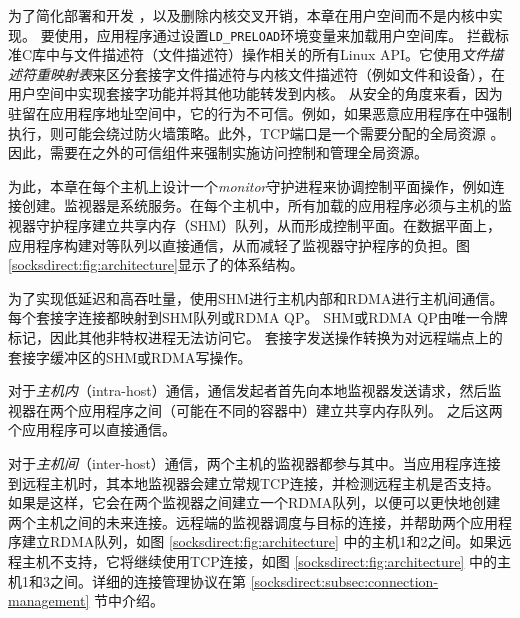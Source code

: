 
为了简化部署和开发 \cite {andromeda}，以及删除内核交叉开销，本章在用户空间而不是内核中实现\sys{}。
要使用\sys{}，应用程序通过设置\texttt {LD\_PRELOAD}环境变量来加载用户空间库\libipc {}。 \libipc {}拦截标准C库中与文件描述符（文件描述符）操作相关的所有Linux API。它使用\emph {文件描述符重映射表}来区分套接字文件描述符与内核文件描述符（例如文件和设备），在用户空间中实现套接字功能并将其他功能转发到内核。
从安全的角度来看，因为\libipc {}驻留在应用程序地址空间中，它的行为不可信。例如，如果恶意应用程序在\libipc {}中强制执行，则可能会绕过防火墙策略。此外，TCP端口是一个需要分配的全局资源 \cite {lin2016scalable,nsdi19freeflow}。因此，需要在\libipc {}之外的可信组件来强制实施访问控制和管理全局资源。

为此，本章在每个主机上设计一个\emph {monitor}守护进程来协调控制平面操作，例如连接创建。监视器是系统服务。在每个主机中，所有加载\libipc {}的应用程序必须与主机的监视器守护程序建立共享内存（SHM）队列，从而形成控制平面。在数据平面上，应用程序构建对等队列以直接通信，从而减轻了监视器守护程序的负担。图 \ref {socksdirect:fig:architecture}显示了\sys {}的体系结构。



为了实现低延迟和高吞吐量，\sys {}使用SHM进行主机内部和RDMA进行主机间通信。
每个套接字连接都映射到SHM队列或RDMA QP。
SHM或RDMA QP由唯一令牌标记，因此其他非特权进程无法访问它。
套接字发送操作转换为对远程端点上的套接字缓冲区的SHM或RDMA写操作。

对于\emph {主机内}（intra-host）通信，通信发起者首先向本地监视器发送请求，然后监视器在两个应用程序之间（可能在不同的容器中）建立共享内存队列。 之后这两个应用程序可以直接通信。



对于\emph {主机间}（inter-host）通信，两个主机的监视器都参与其中。当应用程序连接到远程主机时，其本地监视器会建立常规TCP连接，并检测远程主机是否支持\sys {}。
如果是这样，它会在两个监视器之间建立一个RDMA队列，以便可以更快地创建两个主机之间的未来连接。远程端的监视器调度与目标的连接，并帮助两个应用程序建立RDMA队列，如图 \ref {socksdirect:fig:architecture} 中的主机1和2之间。如果远程主机不支持\sys {}，它将继续使用TCP连接，如图 \ref {socksdirect:fig:architecture} 中的主机1和3之间。详细的连接管理协议在第 \ref {socksdirect:subsec:connection-management} 节中介绍。

